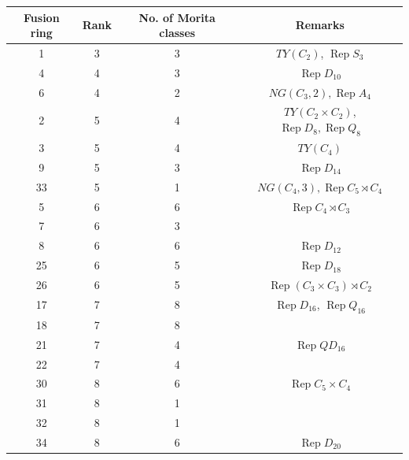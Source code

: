 \documentclass[a4paper, 10pt]{book}
\theoremstyle{definition}
\numberwithin{equation}{chapter}
\newcommand\Rep{\operatorname{Rep}}
\newcommand\semidir\rtimes
\begin{document}
\begin{table}[!htbp]
\centering
\begin{tabular}{|c|c|c|c|}
\hline
Fusion ring & Rank & No. of Morita classes & Remarks\\ \hline
1           & 3    & 3                    	& $TY(C_2)$, $\Rep S_3	$	\\ \hline
4           & 4    & 3                    	&		$\Rep D_{10} $\\ \hline
6           & 4    & 2                   	& $NG(C_3, 2), \Rep A_4 $		 \\ \hline

2           & 5    & 4                   	& $TY(C_2\times C_2)$, $\Rep D_8, \Rep Q_8 $	 \\ \hline
3           & 5    & 4                   	& $TY(C_4)$		 \\ \hline
9           & 5    & 3                   	&	$\Rep D_{14}$	 \\ \hline
33          & 5    & 1                   	&	$NG(C_4, 3), \Rep C_5\semidir C_4$	 \\ \hline

5           & 6    & 6                   	&	$\Rep C_4\semidir C_3 $	 \\ \hline
7           & 6    & 3                   	&		 \\ \hline
8           & 6    & 6                   	&	$\Rep D_{12}$	 \\ \hline
25          & 6    & 5                   	&	$\Rep D_{18}$	 \\ \hline
26          & 6    & 5                    	&	$\Rep (C_3 \times C_3) \semidir C_2$	\\ \hline

17          & 7    & 8                   	&	$\Rep D_{16}$, $\Rep Q_{16}$	 \\ \hline
18          & 7    & 8                   	&		 \\ \hline
21          & 7    & 4                   	&	$\Rep QD_{16}$	 \\ \hline
22          & 7    & 4                   	&		 \\ \hline

30          & 8    & 6                   	&	$\Rep C_5 \times C_4$	 \\ \hline
31          & 8    & 1                   	&		 \\ \hline
32          & 8    & 1                   	&		 \\ \hline
34          & 8    & 6                   	&		$\Rep D_{20}$ \\ \hline


\end{tabular}
\end{table}
\end{document}
